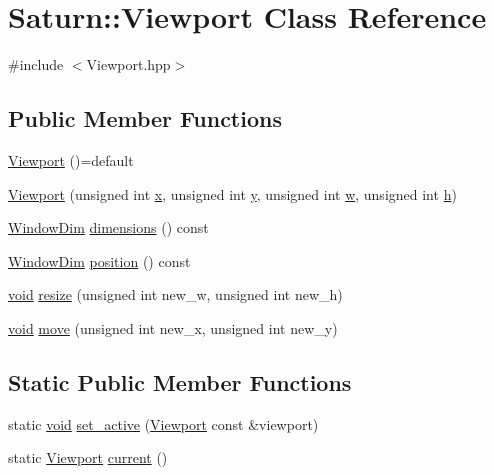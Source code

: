 \hypertarget{class_saturn_1_1_viewport}{}\section{Saturn\+:\+:Viewport Class Reference}
\label{class_saturn_1_1_viewport}


{\ttfamily \#include $<$Viewport.\+hpp$>$}

\subsection*{Public Member Functions}
\begin{DoxyCompactItemize}
\item 
\mbox{\hyperlink{class_saturn_1_1_viewport_a4b10eda1f925d596a3b7fcc3c79b3342}{Viewport}} ()=default
\item 
\mbox{\hyperlink{class_saturn_1_1_viewport_a9d593a555fe1837903e34272915469ae}{Viewport}} (unsigned int \mbox{\hyperlink{glad_8h_a3dddca64560508b8d5bd9ee938e2d3a3}{x}}, unsigned int \mbox{\hyperlink{glad_8h_a12b33d8afd2f771e63a85ea45a440c64}{y}}, unsigned int \mbox{\hyperlink{glad_8h_afb1b07e1b25035d41d60fb2c03d507e6}{w}}, unsigned int \mbox{\hyperlink{glad_8h_afa0fb1b5e976920c0abeff2dca3ed774}{h}})
\item 
\mbox{\hyperlink{namespace_saturn_a606451fdad804aef3b4f56f6805900f2}{Window\+Dim}} \mbox{\hyperlink{class_saturn_1_1_viewport_a37810a2ffacf7d4698e900865559a1a9}{dimensions}} () const
\item 
\mbox{\hyperlink{namespace_saturn_a606451fdad804aef3b4f56f6805900f2}{Window\+Dim}} \mbox{\hyperlink{class_saturn_1_1_viewport_ae430a90f83a57f04e75e6e8be9a97cfb}{position}} () const
\item 
\mbox{\hyperlink{glad_8h_a950fc91edb4504f62f1c577bf4727c29}{void}} \mbox{\hyperlink{class_saturn_1_1_viewport_ad199d45e3adb0c02a84603c72a203fe9}{resize}} (unsigned int new\+\_\+w, unsigned int new\+\_\+h)
\item 
\mbox{\hyperlink{glad_8h_a950fc91edb4504f62f1c577bf4727c29}{void}} \mbox{\hyperlink{class_saturn_1_1_viewport_a1cfa8d2a150c4ceb45937449fa6f4455}{move}} (unsigned int new\+\_\+x, unsigned int new\+\_\+y)
\end{DoxyCompactItemize}
\subsection*{Static Public Member Functions}
\begin{DoxyCompactItemize}
\item 
static \mbox{\hyperlink{glad_8h_a950fc91edb4504f62f1c577bf4727c29}{void}} \mbox{\hyperlink{class_saturn_1_1_viewport_a888fd9e522cecfd2acb7f3fb54b12b20}{set\+\_\+active}} (\mbox{\hyperlink{class_saturn_1_1_viewport}{Viewport}} const \&viewport)
\item 
static \mbox{\hyperlink{class_saturn_1_1_viewport}{Viewport}} \mbox{\hyperlink{class_saturn_1_1_viewport_ae1d00a96641eb4f3c945c74402157f6d}{current}} ()
\end{DoxyCompactItemize}


